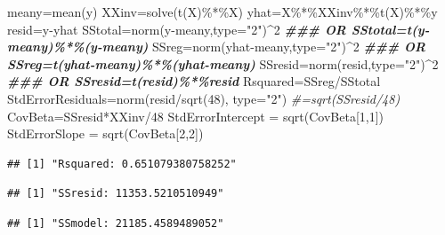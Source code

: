 \documentclass[
]{article}
\newenvironment{Shaded}{\begin{snugshade}}{\end{snugshade}}
\newcommand{\AttributeTok}[1]{\textcolor[rgb]{0.77,0.63,0.00}{#1}}
\newcommand{\CommentTok}[1]{\textcolor[rgb]{0.56,0.35,0.01}{\textit{#1}}}
\newcommand{\DecValTok}[1]{\textcolor[rgb]{0.00,0.00,0.81}{#1}}
\newcommand{\DocumentationTok}[1]{\textcolor[rgb]{0.56,0.35,0.01}{\textbf{\textit{#1}}}}
\newcommand{\FunctionTok}[1]{\textcolor[rgb]{0.00,0.00,0.00}{#1}}
\newcommand{\NormalTok}[1]{#1}
\newcommand{\OtherTok}[1]{\textcolor[rgb]{0.56,0.35,0.01}{#1}}
\newcommand{\SpecialCharTok}[1]{\textcolor[rgb]{0.00,0.00,0.00}{#1}}
\newcommand{\StringTok}[1]{\textcolor[rgb]{0.31,0.60,0.02}{#1}}
\theoremstyle{definition}
\theoremstyle{definition}
\theoremstyle{definition}
\theoremstyle{definition}
\theoremstyle{remark}
\begin{document}
\begin{Shaded}
\begin{Highlighting}[]
\NormalTok{meany}\OtherTok{=}\FunctionTok{mean}\NormalTok{(y)}
\NormalTok{XXinv}\OtherTok{=}\FunctionTok{solve}\NormalTok{(}\FunctionTok{t}\NormalTok{(X)}\SpecialCharTok{\%*\%}\NormalTok{X)}
\NormalTok{yhat}\OtherTok{=}\NormalTok{X}\SpecialCharTok{\%*\%}\NormalTok{XXinv}\SpecialCharTok{\%*\%}\FunctionTok{t}\NormalTok{(X)}\SpecialCharTok{\%*\%}\NormalTok{y}
\NormalTok{resid}\OtherTok{=}\NormalTok{y}\SpecialCharTok{{-}}\NormalTok{yhat}
\NormalTok{SStotal}\OtherTok{=}\FunctionTok{norm}\NormalTok{(y}\SpecialCharTok{{-}}\NormalTok{meany,}\AttributeTok{type=}\StringTok{"2"}\NormalTok{)}\SpecialCharTok{\^{}}\DecValTok{2}
\DocumentationTok{\#\#\# OR  SStotal=t(y{-}meany)\%*\%(y{-}meany)}
\NormalTok{SSreg}\OtherTok{=}\FunctionTok{norm}\NormalTok{(yhat}\SpecialCharTok{{-}}\NormalTok{meany,}\AttributeTok{type=}\StringTok{"2"}\NormalTok{)}\SpecialCharTok{\^{}}\DecValTok{2}
\DocumentationTok{\#\#\# OR  SSreg=t(yhat{-}meany)\%*\%(yhat{-}meany)}
\NormalTok{SSresid}\OtherTok{=}\FunctionTok{norm}\NormalTok{(resid,}\AttributeTok{type=}\StringTok{"2"}\NormalTok{)}\SpecialCharTok{\^{}}\DecValTok{2}
\DocumentationTok{\#\#\# OR SSresid=t(resid)\%*\%resid}
\NormalTok{Rsquared}\OtherTok{=}\NormalTok{SSreg}\SpecialCharTok{/}\NormalTok{SStotal}
\NormalTok{StdErrorResiduals}\OtherTok{=}\FunctionTok{norm}\NormalTok{(resid}\SpecialCharTok{/}\FunctionTok{sqrt}\NormalTok{(}\DecValTok{48}\NormalTok{), }\AttributeTok{type=}\StringTok{"2"}\NormalTok{) }\CommentTok{\#=sqrt(SSresid/48)}
\NormalTok{CovBeta}\OtherTok{=}\NormalTok{SSresid}\SpecialCharTok{*}\NormalTok{XXinv}\SpecialCharTok{/}\DecValTok{48}
\NormalTok{StdErrorIntercept }\OtherTok{=} \FunctionTok{sqrt}\NormalTok{(CovBeta[}\DecValTok{1}\NormalTok{,}\DecValTok{1}\NormalTok{])}
\NormalTok{StdErrorSlope }\OtherTok{=} \FunctionTok{sqrt}\NormalTok{(CovBeta[}\DecValTok{2}\NormalTok{,}\DecValTok{2}\NormalTok{])}
\end{Highlighting}
\end{Shaded}

\begin{verbatim}
## [1] "Rsquared: 0.651079380758252"
\end{verbatim}

\begin{verbatim}
## [1] "SSresid: 11353.5210510949"
\end{verbatim}

\begin{verbatim}
## [1] "SSmodel: 21185.4589489052"
\end{verbatim}
\end{document}
